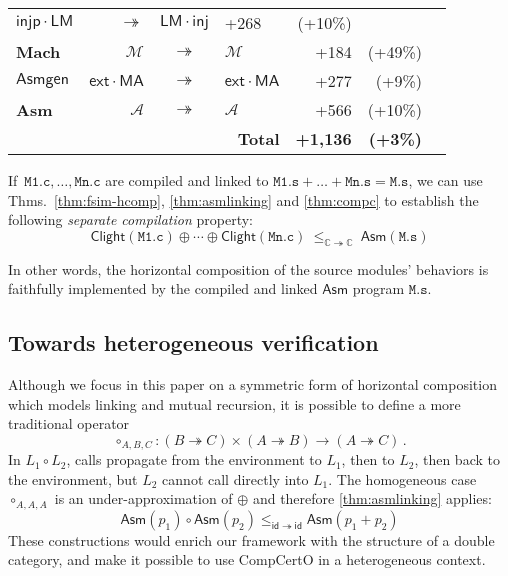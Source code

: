 \documentclass[sigplan,screen]{acmart}
\newcommand{\kw}[1]{\ensuremath{ \mathsf{#1} }}
\newcommand{\cc}[2]{{ \kw{#1#2} }}
\newcommand{\filltint}{!40}
\newcommand{\tbltint}{\filltint}
\begin{document}
\begin{table}
\begin{tabular}{lrclrrr}
      $\kw{injp} \cdot \cc{L}{M} $ &
      $\twoheadrightarrow$ &
      $\cc{L}{M} \cdot \kw{inj}$ &
      +268 & (+10\%)
    \\
    \rowcolor{ACMOrange\tbltint}
    \textbf{Mach} &
      $\mathcal{M}$ &
      $\twoheadrightarrow$ &
      $\mathcal{M}$ &
      +184 & (+49\%)
    \\
    \kw{Asmgen} &
      $\kw{ext} \cdot \cc{M}{A}$ &
      $\twoheadrightarrow$ &
      $\kw{ext} \cdot \cc{M}{A}$ &
      +277 & (+9\%)
    \\
    \rowcolor{ACMRed\tbltint}
    \textbf{Asm} &
      $\mathcal{A}$ &
      $\twoheadrightarrow$ &
      $\mathcal{A}$ &
      +566 & (+10\%)
    \\
    \midrule
    \multicolumn{4}{r}{\bf Total \quad{} } &
      \bf +1{,}136 & \bf (+3\%)
    \\
    \bottomrule
  \end{tabular}
\end{table}


\begin{corollary} \label{cor:sepcomp} %
If\,
$\mathtt{M1.c}, \ldots, \mathtt{Mn.c}$
are compiled and linked to
$\mathtt{M1.s} + \ldots + \mathtt{Mn.s} = \mathtt{M.s}$,
we can use
Thms.~\ref{thm:fsim-hcomp},
\ref{thm:asmlinking} and
\ref{thm:compc}
to establish the following \emph{separate compilation} property:
\[
  \kw{Clight}(\mathtt{M1.c}) \oplus \cdots \oplus \kw{Clight}(\mathtt{Mn.c})
  \:\le_{\mathbb{C} \twoheadrightarrow \mathbb{C}}\:
  \kw{Asm}(\mathtt{M.s})
\]
\end{corollary}

\noindent
In other words,
the horizontal composition of the source modules' behaviors
is faithfully implemented by
the compiled and linked \kw{Asm} program
$\mathtt{M.s}$.


\subsection{Towards heterogeneous verification} \label{sec:nicagain} %

Although we focus in this paper on a symmetric form
of horizontal composition
which models linking and mutual recursion,
it is possible to define a more traditional operator
\[
  {\circ_{A,B,C}} : (B \twoheadrightarrow C) \times (A \twoheadrightarrow B)
    \rightarrow (A \twoheadrightarrow C)
  \,.
\]
In $L_1 \circ L_2$,
calls propagate from the environment to $L_1$,
then to $L_2$,
then back to the environment,
but $L_2$ cannot call directly into $L_1$.
The homogeneous case $\circ_{A,A,A}$ is
an under-approximation of $\oplus$
and therefore \autoref{thm:asmlinking} applies:
\[
  \kw{Asm}(p_1) \circ \kw{Asm}(p_2)
  \le_{\kw{id} \twoheadrightarrow \kw{id}}
  \kw{Asm}(p_1 + p_2)
\]
These constructions would
enrich our framework with the structure of a double category,
and make it possible to use CompCertO
in a heterogeneous context.
\end{document}
